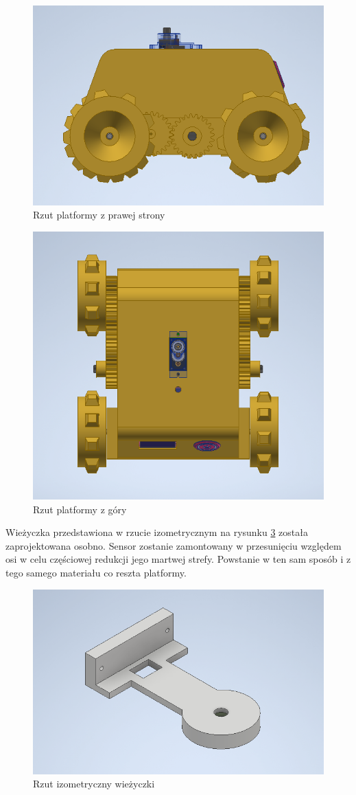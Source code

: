\begin{figure}[H]
	\centering
		\includegraphics[width=0.6\linewidth]{rys/view2.png}
	\caption{Rzut platformy z prawej strony}
	\label{fig:view2}
\end{figure}

\begin{figure}[H]
	\centering
		\includegraphics[width=0.6\linewidth]{rys/view3.png}
	\caption{Rzut platformy z góry}
	\label{fig:view3}
\end{figure}

Wieżyczka przedstawiona w rzucie izometrycznym na rysunku \ref{fig:tower} została zaprojektowana osobno. Sensor zostanie zamontowany w przesunięciu względem osi w celu częściowej redukcji jego martwej strefy. Powstanie w ten sam sposób i z tego samego materiału co reszta platformy.

\begin{figure}[ht]
	\centering
		\includegraphics[width=0.6\linewidth]{rys/arm.png}
	\caption{Rzut izometryczny wieżyczki}
	\label{fig:tower}
\end{figure}

